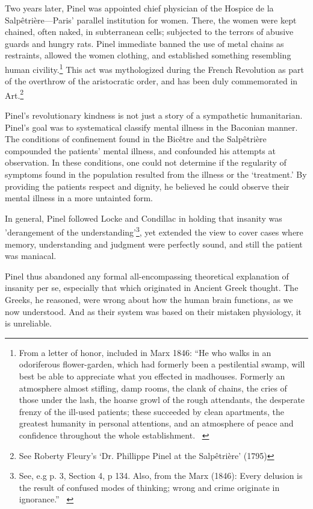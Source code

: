 \begin{refsection}
Two years later, Pinel was appointed chief physician of the Hospice de la Salpêtrière---Paris' parallel institution for women. There, the women were kept chained, often naked, in subterranean cells; subjected to the terrors of abusive guards and hungry rats. Pinel immediate banned the use of metal chains as restraints, allowed the women clothing, and established something resembling human civility.\footnote{From a letter of honor, included in Marx 1846: “He who walks in an odoriferous flower-garden, which had formerly been a pestilential swamp, will best be able to appreciate what you effected in madhouses. Formerly an atmosphere almost stifling, damp rooms, the clank of chains, the cries of those under the lash, the hoarse growl of the rough attendants, the desperate frenzy of the ill-used patients; these succeeded by clean apartments, the greatest humanity in personal attentions, and an atmosphere of peace and confidence throughout the whole establishment. ~\citep[p. 210]{Marx:1847vc}} This act was mythologized during the French Revolution as part of the overthrow of the aristocratic order, and has been duly commemorated in Art.\footnote{See Roberty Fleury's `Dr. Phillippe Pinel at the Salpêtrière' (1795)}

Pinel's revolutionary kindness is not just a story of a sympathetic humanitarian. Pinel's goal was to systematical classify mental illness in the Baconian manner. The conditions of confinement found in the Bicêtre and the Salpêtrière compounded the patients' mental illness, and confounded his attempts at observation. In these conditions, one could not determine if the regularity of symptoms found in the population resulted from the illness or the ‘treatment.’ By providing the patients respect and dignity, he believed he could observe their mental illness in a more untainted form.

In general, Pinel followed Locke and Condillac in holding that insanity was 'derangement of the understanding’\footnote{See, e.g p. 3, Section 4, p 134. Also, from the Marx (1846): Every delusion is the result of confused modes of thinking; wrong and crime originate in ignorance.” ~\citep[p. 212]{Marx:1847vc}}, yet extended the view to cover cases where memory, understanding and judgment were perfectly sound, and still the patient was maniacal. 

Pinel thus abandoned any formal all-encompassing theoretical explanation of insanity per se, especially that which originated in Ancient Greek thought. The Greeks, he reasoned, were wrong about how the human brain functions, as we now understood. And as their system was based on their mistaken physiology, it is unreliable. 


\end{refsection}

